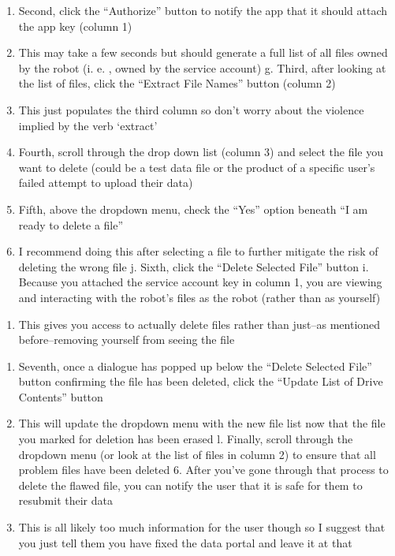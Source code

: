 \documentclass[
  letterpaper,
  oneside,
  open=any]{scrbook}
\providecommand{\tightlist}{%
  \setlength{\itemsep}{0pt}\setlength{\parskip}{0pt}}\usepackage{longtable,booktabs,array}
\begin{document}
\begin{enumerate}
\def\labelenumi{\alph{enumi}.}
\setcounter{enumi}{5}
\item
  Second, click the ``Authorize'' button to notify the app that it
  should attach the app key (column 1)
\item
  This may take a few seconds but should generate a full list of all
  files owned by the robot (i. e. , owned by the service account) g.
  Third, after looking at the list of files, click the ``Extract File
  Names'' button (column 2)
\item
  This just populates the third column so don't worry about the violence
  implied by the verb `extract'
\item
  Fourth, scroll through the drop down list (column 3) and select the
  file you want to delete (could be a test data file or the product of a
  specific user's failed attempt to upload their data)
\item
  Fifth, above the dropdown menu, check the ``Yes'' option beneath ``I
  am ready to delete a file''
\item
  I recommend doing this after selecting a file to further mitigate the
  risk of deleting the wrong file j. Sixth, click the ``Delete Selected
  File'' button i. Because you attached the service account key in
  column 1, you are viewing and interacting with the robot's files as
  the robot (rather than as yourself)
\end{enumerate}

\begin{enumerate}
\def\labelenumi{\roman{enumi}.}
\setcounter{enumi}{1}
\tightlist
\item
  This gives you access to actually delete files rather than just--as
  mentioned before--removing yourself from seeing the file
\end{enumerate}

\begin{enumerate}
\def\labelenumi{\alph{enumi}.}
\setcounter{enumi}{10}
\item
  Seventh, once a dialogue has popped up below the ``Delete Selected
  File'' button confirming the file has been deleted, click the ``Update
  List of Drive Contents'' button
\item
  This will update the dropdown menu with the new file list now that the
  file you marked for deletion has been erased l. Finally, scroll
  through the dropdown menu (or look at the list of files in column 2)
  to ensure that all problem files have been deleted 6. After you've
  gone through that process to delete the flawed file, you can notify
  the user that it is safe for them to resubmit their data
\item
  This is all likely too much information for the user though so I
  suggest that you just tell them you have fixed the data portal and
  leave it at that
\end{enumerate}
\end{document}
